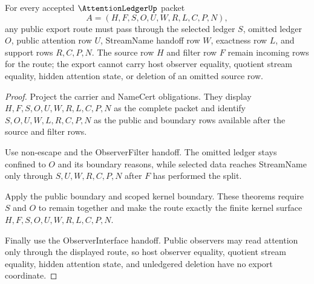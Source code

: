 \begin{theorem}
\label{thm:attention-ledger-public-route-export}
For every accepted $\AttentionLedgerUp$ packet
$$
A=(H,F,S,O,U,W,R,L,C,P,N),
$$
any public export route must pass through the selected ledger $S$, omitted ledger $O$, public attention row $U$, StreamName handoff row $W$, exactness row $L$, and support rows $R,C,P,N$. The source row $H$ and filter row $F$ remain incoming rows for the route; the export cannot carry host observer equality, quotient stream equality, hidden attention state, or deletion of an omitted source row.
\end{theorem}
\begin{proof}
Project the carrier and NameCert obligations. They display $H,F,S,O,U,W,R,L,C,P,N$ as the complete packet and identify $S,O,U,W,L,R,C,P,N$ as the public and boundary rows available after the source and filter rows.

Use non-escape and the ObserverFilter handoff. The omitted ledger stays confined to $O$ and its boundary reasons, while selected data reaches StreamName only through $S,U,W,R,C,P,N$ after $F$ has performed the split.

Apply the public boundary and scoped kernel boundary. These theorems require $S$ and $O$ to remain together and make the route exactly the finite kernel surface $H,F,S,O,U,W,R,L,C,P,N$.

Finally use the ObserverInterface handoff. Public observers may read attention only through the displayed route, so host observer equality, quotient stream equality, hidden attention state, and unledgered deletion have no export coordinate.
\end{proof}



